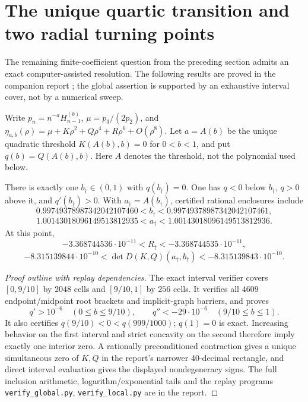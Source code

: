 \section{The unique quartic transition and two radial turning points}
\label{rbif:int:section}
The remaining finite-coefficient question from the preceding section admits
an exact computer-assisted resolution. The following results are proved
in the companion report \cite{rbif:continuation}; the global assertion is
supported by an exhaustive interval cover, not by a numerical sweep.

Write $p_n=n^{-a}H_{n-1}^{(b)}$, $\mu=p_3/(2p_2)$, and
$\eta_{a,b}(\rho)=\mu+K\rho^2+Q\rho^4+R\rho^6+O(\rho^8)$.
Let $a=A(b)$ be the unique quadratic threshold $K(A(b),b)=0$ for
$0<b<1$, and put $q(b)=Q(A(b),b)$. Here $A$ denotes the threshold,
not the polynomial used below.

\begin{theorem}
\label{rbif:int:quartic}
There is exactly one $b_\dagger\in(0,1)$ with $q(b_\dagger)=0$.
One has $q<0$ below $b_\dagger$, $q>0$ above it, and
$q'(b_\dagger)>0$. With $a_\dagger=A(b_\dagger)$, certified
rational enclosures include
\[
 0.99749378987342042107460<b_\dagger
       <0.99749378987342042107461,
\]
\[
 1.00143018096149513812935<a_\dagger
       <1.00143018096149513812936.
\]
At this point,
\[
 -3.368744536\cdot10^{-11}<R_\dagger<-3.368744535\cdot10^{-11},
\]
\[
 -8.315139844\cdot10^{-10}
 <\det D(K,Q)(a_\dagger,b_\dagger)<-8.315139843\cdot10^{-10}.
\]
\end{theorem}
\begin{proof}[Proof outline with replay dependencies]
The exact interval verifier covers $[0,9/10]$ by $2048$ cells and
$[9/10,1]$ by $256$ cells. It verifies all $4609$ endpoint/midpoint
root brackets and implicit-graph barriers, and proves
\[
 q'>10^{-6}\quad(0\le b\le9/10),\qquad
 q''<-29\cdot10^{-6}\quad(9/10\le b\le1).
\]
It also certifies $q(9/10)<0<q(999/1000)$; $q(1)=0$ is exact.
Increasing behavior on the first interval and strict concavity on the
second therefore imply exactly one interior zero. A rationally
preconditioned contraction gives a unique simultaneous zero of $K,Q$ in
the report's narrower 40-decimal rectangle, and direct interval evaluation
gives the displayed nondegeneracy signs. The full inclusion arithmetic,
logarithm/exponential tails and the replay programs
\texttt{verify\_global.py}, \texttt{verify\_local.py} are in the report.
\end{proof}

